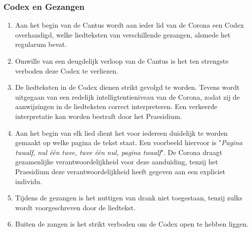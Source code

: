 \subsubsection*{Codex en Gezangen}
\begin{enumerate}
    \item Aan het begin van de Cantus wordt aan ieder lid van de Corona een Codex overhandigd, welke liedteksten van verschillende gezangen, alsmede het regularum bevat.
    \item Omwille van een deugdelijk verloop van de Cantus is het ten strengste verboden deze Codex te verliezen.
    \item De liedteksten in de Codex dienen strikt gevolgd te worden. Tevens wordt uitgegaan van een redelijk intelligtentieniveau van de Corona, zodat zij de aanwijzingen in de liedteksten correct interpreteren. Een verkeerde interpretatie kan worden bestraft door het Praesidium.
    \item Aan het begin van elk lied dient het voor iedereen duidelijk te worden gemaakt op welke pagina de tekst staat. Een voorbeeld hiervoor is "\textit{Pagina twaalf, nul één twee, twee één nul, pagina twaalf}". De Corona draagt gezamenlijke verantwoordelijkheid voor deze aanduiding, tenzij het Praesidium deze verantwoordelijkheid heeft gegeven aan een expliciet individu. 
    \item Tijdens de gezangen is het nuttigen van drank niet toegestaan, tenzij zulks wordt voorgeschreven door de liedtekst.
    \item Buiten de zangen is het strikt verboden om de Codex open te hebben liggen. 
\end{enumerate}

